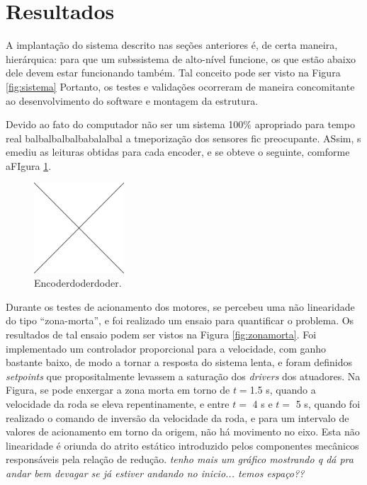 \section{Resultados}
\label{sec:resultados}

A implantação do sistema descrito nas seções anteriores é, de certa maneira, hierárquica: para que um subssistema de alto-nível funcione, os que estão abaixo dele devem estar funcionando também. Tal conceito pode ser visto na Figura \ref{fig:sistema} Portanto, os testes e validações ocorreram de maneira concomitante ao desenvolvimento do software e montagem da estrutura.

Devido ao fato do computador não ser um sistema 100\% apropriado para tempo real balbalbalbalbabalalbal a tmeporização dos sensores fic preocupante. ASsim, s emediu as leituras obtidas para cada encoder, e se obteve o seguinte, comforme  aFIgura \ref{fig:pos_encoder}.

\begin{figure}[h]
  \centering
  \includegraphics[width = 0.3\textwidth]{imagens/edc}
  \caption{Encoderdoderdoder.}
  \label{fig:pos_encoder}
\end{figure}

Durante os testes de acionamento dos motores, se percebeu uma não linearidade do tipo ``zona-morta'', e foi realizado um ensaio para quantificar o problema. Os resultados de tal ensaio podem ser vistos na Figura \ref{fig:zonamorta}. Foi implementado um controlador proporcional para a velocidade, com ganho bastante baixo, de modo a tornar a resposta do sistema lenta, e foram definidos \emph{setpoints} que propositalmente levassem a saturação dos \textit{drivers} dos atuadores. Na Figura, se pode enxergar a zona morta em torno de $t=$1.5 s, quando a velocidade da roda se eleva repentinamente, e entre $t=$ 4 s e $t=$ 5 s, quando foi realizado o comando de inversão da velocidade da roda, e para um intervalo de valores de acionamento em torno da origem, não há movimento no eixo. Esta não linearidade é oriunda do atrito estático introduzido pelos componentes mecânicos responsáveis pela relação de redução. \textit{tenho mais um gráfico mostrando q dá pra andar bem devagar se já estiver andando no inicio... temos espaço??}

